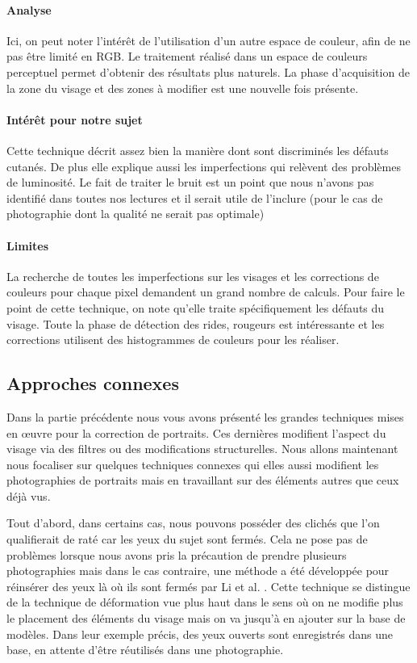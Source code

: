 \documentclass[11pt, french]{report-rd-info}
\begin{document}
\paragraph{Analyse}
Ici, on peut noter l'intérêt de l'utilisation d'un autre espace de couleur, afin de ne pas être limité en RGB. Le traitement réalisé dans un espace de couleurs perceptuel permet d'obtenir des résultats plus naturels. La phase d'acquisition de la zone du visage et des zones à modifier est une nouvelle fois présente.
\paragraph{Intérêt pour notre sujet}
Cette technique décrit assez bien la manière dont sont discriminés les défauts cutanés. De plus elle explique aussi les imperfections qui relèvent des problèmes de luminosité. Le fait de traiter le bruit est un point que nous n’avons pas identifié dans toutes nos lectures et il serait utile de l’inclure (pour le cas de photographie dont la qualité ne serait pas optimale)
\paragraph{Limites}
La recherche de toutes les imperfections sur les visages et les corrections de couleurs pour chaque pixel demandent un grand nombre de calculs.
Pour faire le point de cette technique, on note qu’elle traite spécifiquement les défauts du visage. Toute la phase de détection des rides, rougeurs est intéressante et les corrections utilisent des histogrammes de couleurs pour les réaliser.
\subsection{Approches connexes}
Dans la partie précédente nous vous avons présenté les grandes techniques mises en œuvre pour la correction de portraits. Ces dernières modifient l’aspect du visage via des filtres ou des modifications structurelles. Nous allons maintenant nous focaliser sur quelques techniques connexes qui elles aussi modifient les photographies de portraits mais en travaillant sur des éléments autres que ceux déjà vus.

Tout d’abord, dans certains cas, nous pouvons posséder des clichés que l'on qualifierait de raté car les yeux du sujet sont fermés. Cela ne pose pas de problèmes lorsque nous avons pris la précaution de prendre plusieurs photographies mais dans le cas contraire, une méthode a été développée pour réinsérer des yeux là où ils sont fermés par Li et al. \cite{Li2011}. Cette technique se distingue de la technique de déformation vue plus haut dans le sens où on ne modifie plus le placement des éléments du visage mais on va jusqu'à en ajouter sur la base de modèles. Dans leur exemple précis, des yeux ouverts sont enregistrés dans une base, en attente d’être réutilisés dans une photographie.
\end{document}
